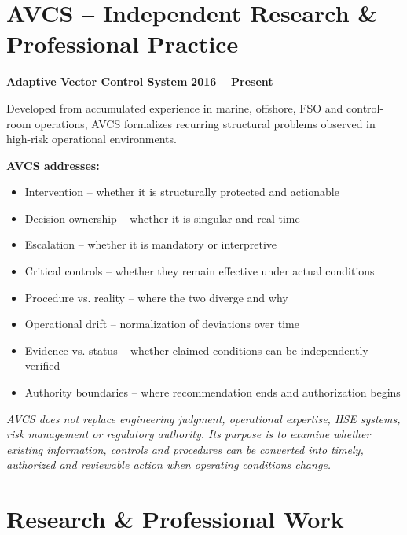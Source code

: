 \documentclass[11pt,a4paper]{article}
\begin{document}
\section*{AVCS -- Independent Research \& Professional Practice}

\textbf{\color{avcsdark}Adaptive Vector Control System} \hfill \textbf{\color{avcsgray}2016 -- Present}

\vspace{2pt}
Developed from accumulated experience in marine, offshore, FSO and control-room operations, AVCS formalizes recurring structural problems observed in high-risk operational environments.

\textbf{AVCS addresses:}
\begin{itemize}[leftmargin=*, nosep, itemsep=2pt]
    \item Intervention -- whether it is structurally protected and actionable
    \item Decision ownership -- whether it is singular and real-time
    \item Escalation -- whether it is mandatory or interpretive
    \item Critical controls -- whether they remain effective under actual conditions
    \item Procedure vs. reality -- where the two diverge and why
    \item Operational drift -- normalization of deviations over time
    \item Evidence vs. status -- whether claimed conditions can be independently verified
    \item Authority boundaries -- where recommendation ends and authorization begins
\end{itemize}

\vspace{4pt}
\textit{AVCS does not replace engineering judgment, operational expertise, HSE systems, risk management or regulatory authority. Its purpose is to examine whether existing information, controls and procedures can be converted into timely, authorized and reviewable action when operating conditions change.}

\section*{Research \& Professional Work}
\end{document}
